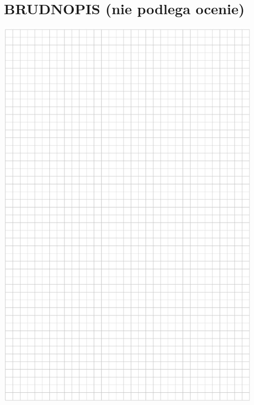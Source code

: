 \documentclass[10pt]{article}
\begin{document}
\section*{BRUDNOPIS (nie podlega ocenie)}
\begin{center}
\includegraphics[max width=\textwidth]{2024_11_21_d51d653f4fe4a5bb0c33g-11}
\end{center}
\end{document}
